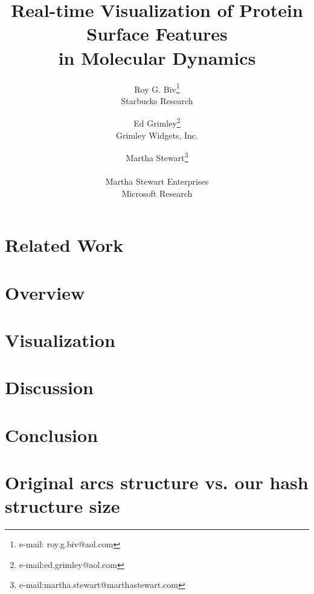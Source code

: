 \documentclass[review]{vgtc}                 %
\title{Real-time Visualization of Protein Surface Features\\in Molecular Dynamics}
\author{Roy G. Biv\thanks{e-mail: roy.g.biv@aol.com}\\ %
        \scriptsize Starbucks Research %
\and Ed Grimley\thanks{e-mail:ed.grimley@aol.com}\\ %
     \scriptsize Grimley Widgets, Inc. %
\and Martha Stewart\thanks{e-mail:martha.stewart@marthastewart.com}\\ %
     \parbox{1.4in}{\scriptsize \centering Martha Stewart Enterprises \\ Microsoft Research}}
\begin{document}


\maketitle



\section{Related Work}


\section{Overview}




\section{Visualization}


\section{Discussion}


\section{Conclusion}






\appendix
\section{Original arcs structure vs. our hash structure size}

\end{document}
